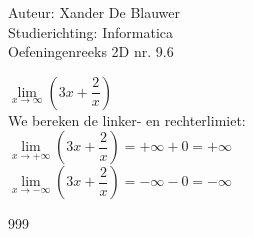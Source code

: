 \documentclass[a4paper]{article}
\begin{document}
\noindent \large Auteur: Xander De Blauwer \\
\noindent \large Studierichting: Informatica\\
\noindent \large Oefeningenreeks 2D nr. 9.6\\

\medskip

\normalsize

$\lim\limits_{x \rightarrow \infty} \left(3x + \dfrac{2}{x}\right)$ \\

We bereken de linker- en rechterlimiet: \\

$\lim\limits_{x \rightarrow +\infty} \left(3x + \dfrac{2}{x}\right) = +\infty + 0 = +\infty$ \\

$\lim\limits_{x \rightarrow -\infty} \left(3x + \dfrac{2}{x}\right) = -\infty - 0 = -\infty$ \\









\begin{thebibliography}{999}
\end{thebibliography}
\end{document}
